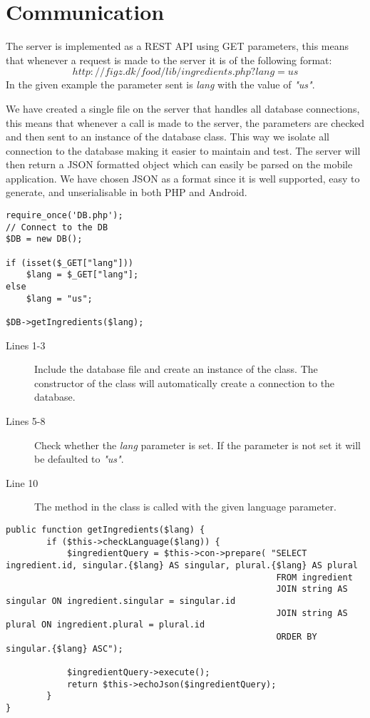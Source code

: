 \section{Communication}
\label{sec:com}

The server is implemented as a REST API using GET parameters, this means that whenever a request is made to the server it is of the following format: $$http://figz.dk/food/lib/ingredients.php?lang=us$$ In the given example the parameter sent is \textit{lang} with the value of \textit{"us"}.

We have created a single file on the server that handles all database connections, this means that whenever a call is made to the server, the parameters are checked and then sent to an instance of the database class. This way we isolate all connection to the database making it easier to maintain and test. The server will then return a JSON formatted object which can easily be parsed on the mobile application. We have chosen JSON as a format since it is well supported, easy to generate, and unserialisable in both PHP and Android.

\begin{lstlisting}[language=phpstyle, caption=ingredients.php]
require_once('DB.php');
// Connect to the DB
$DB = new DB();

if (isset($_GET["lang"]))
	$lang = $_GET["lang"];
else
	$lang = "us";

$DB->getIngredients($lang);
\end{lstlisting}%

\begin{description}
\item[Lines 1-3] Include the database file and create an instance of the  class. The constructor of the  class will automatically create a connection to the database.
\item[Lines 5-8] Check whether the \textit{lang} parameter is set. If the parameter is not set it will be defaulted to \textit{"us"}.
\item[Line 10] The method  in the  class is called with the given language parameter.
\end{description}

\begin{lstlisting}[language=phpstyle, label=lst:getIngredients, caption=getIngredients() method of DB class]
public function getIngredients($lang) {
        if ($this->checkLanguage($lang)) {
            $ingredientQuery = $this->con->prepare( "SELECT ingredient.id, singular.{$lang} AS singular, plural.{$lang} AS plural
            			                             FROM ingredient
            			                             JOIN string AS singular ON ingredient.singular = singular.id
            			                             JOIN string AS plural ON ingredient.plural = plural.id
                                                     ORDER BY singular.{$lang} ASC");

            $ingredientQuery->execute();
            return $this->echoJson($ingredientQuery);
        }
}
\end{lstlisting}%

